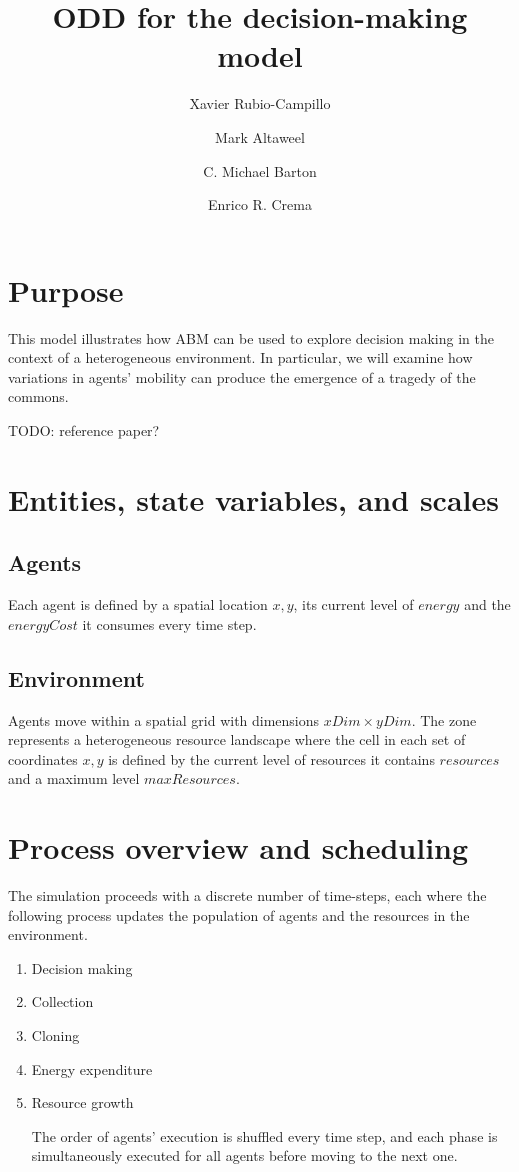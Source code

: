 \documentclass[11pt,a4paper,twocolumn,notitlepage]{article}
\begin{document}
\title{ODD for the decision-making model}
\author{Xavier Rubio-Campillo \and Mark Altaweel \and C. Michael Barton \and Enrico R. Crema}
\maketitle

\section{Purpose}

This model illustrates how ABM can be used to explore decision making in the context of a heterogeneous environment. In particular, we will examine how variations in agents' mobility can produce the emergence of a tragedy of the commons.

TODO: reference paper?

\section{Entities, state variables, and scales}
\subsection{Agents}

Each agent is defined by a spatial location $x,y$, its current level of $energy$ and the $energyCost$ it consumes every time step.

\subsection{Environment}

Agents move within a spatial grid with dimensions $xDim \times yDim$. The zone represents a heterogeneous resource landscape where the cell in each set of coordinates $x,y$ is defined by the current level of resources it contains $resources$ and a maximum level $maxResources$. 

\section{Process overview and scheduling}

The simulation proceeds with a discrete number of time-steps, each where the following process updates the population of agents and the resources in the environment.

\begin{enumerate}
\item{Decision making}
\item{Collection}
\item{Cloning}
\item{Energy expenditure}
\item{Resource growth}

The order of agents' execution is shuffled every time step, and each phase is simultaneously executed for all agents before moving to the next one.

\end{enumerate}
\end{document}
